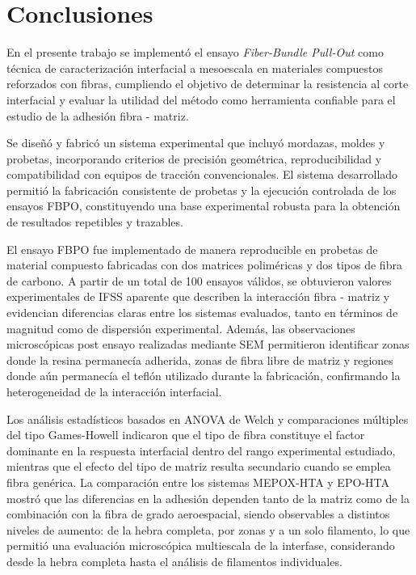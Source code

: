 \section{Conclusiones}

En el presente trabajo se implementó el ensayo \textit{Fiber-Bundle Pull-Out} como técnica
de caracterización interfacial a mesoescala en materiales compuestos reforzados con fibras,
cumpliendo el objetivo de determinar la resistencia al corte interfacial y evaluar
la utilidad del método como herramienta confiable para el estudio de la adhesión fibra - matriz.

Se diseñó y fabricó un sistema experimental que incluyó mordazas, moldes y probetas, incorporando
criterios de precisión geométrica, reproducibilidad y compatibilidad con equipos de tracción
convencionales. El sistema desarrollado permitió la fabricación consistente de probetas y la
ejecución controlada de los ensayos FBPO, constituyendo una base experimental robusta para la
obtención de resultados repetibles y trazables.

El ensayo FBPO fue implementado de manera reproducible en probetas de material compuesto fabricadas con dos
matrices poliméricas y dos tipos de fibra de carbono. A partir de un total de 100 ensayos válidos,
se obtuvieron valores experimentales de IFSS aparente que describen la interacción fibra - matriz
y evidencian diferencias claras entre los sistemas evaluados, tanto en términos de magnitud como
de dispersión experimental. Además, las observaciones microscópicas post ensayo realizadas mediante
SEM permitieron identificar zonas donde la resina permanecía adherida, zonas de fibra libre de
matriz y regiones donde aún permanecía el teflón utilizado durante la fabricación, confirmando
la heterogeneidad de la interacción interfacial.

Los análisis estadísticos basados en ANOVA de Welch y comparaciones múltiples del tipo Games-Howell
indicaron que el tipo de fibra constituye el factor dominante en la respuesta interfacial dentro
del rango experimental estudiado, mientras que el efecto del tipo de matriz resulta secundario
cuando se emplea fibra genérica. La comparación entre los sistemas MEPOX-HTA y EPO-HTA mostró que
las diferencias en la adhesión dependen tanto de la matriz como de la combinación con la fibra de
grado aeroespacial, siendo observables a distintos niveles de aumento: de la hebra completa, por
zonas y a un solo filamento, lo que permitió una evaluación microscópica multiescala de la interfase,
considerando desde la hebra completa hasta el análisis de filamentos individuales.


